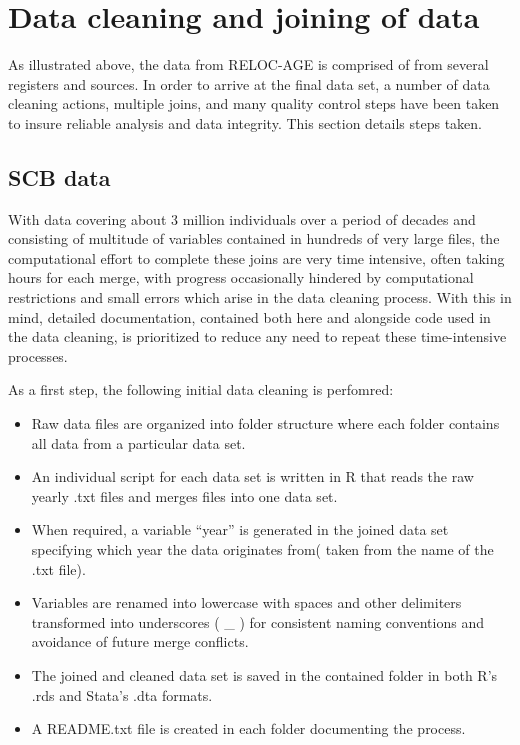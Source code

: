 \documentclass[
]{book}
\providecommand{\tightlist}{%
  \setlength{\itemsep}{0pt}\setlength{\parskip}{0pt}}
\begin{document}
\hypertarget{data-cleaning-and-joining-of-data}{%
\chapter{Data cleaning and joining of data}\label{data-cleaning-and-joining-of-data}}

As illustrated above, the data from RELOC-AGE is comprised of from several registers and sources. In order to arrive at the final data set, a number of data cleaning actions, multiple joins, and many quality control steps have been taken to insure reliable analysis and data integrity. This section details steps taken.

\hypertarget{scb-data}{%
\section{SCB data}\label{scb-data}}

With data covering about 3 million individuals over a period of decades and consisting of multitude of variables contained in hundreds of very large files, the computational effort to complete these joins are very time intensive, often taking hours for each merge, with progress occasionally hindered by computational restrictions and small errors which arise in the data cleaning process. With this in mind, detailed documentation, contained both here and alongside code used in the data cleaning, is prioritized to reduce any need to repeat these time-intensive processes.

As a first step, the following initial data cleaning is perfomred:

\begin{itemize}
\tightlist
\item
  Raw data files are organized into folder structure where each folder contains all data from a particular data set.
\item
  An individual script for each data set is written in R that reads the raw yearly .txt files and merges files into one data set.
\item
  When required, a variable ``year'' is generated in the joined data set specifying which year the data originates from( taken from the name of the .txt file).
\item
  Variables are renamed into lowercase with spaces and other delimiters transformed into underscores ( \_ ) for consistent naming conventions and avoidance of future merge conflicts.
\item
  The joined and cleaned data set is saved in the contained folder in both R's .rds and Stata's .dta formats.
\item
  A README.txt file is created in each folder documenting the process.
\end{itemize}
\end{document}
